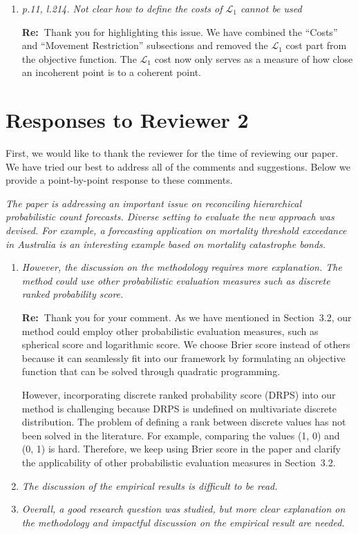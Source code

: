 \documentclass[11pt,a4paper]{article}
\newcommand{\RE}[2][Re:~]{{\color{blue}\textbf{#1}#2}}
\begin{document}
\begin{enumerate}
\begin{enumerate}
    \RE{Done. Thank you.}
    \item \textit{p.11, l.214. Not clear how to define the costs of $\mathcal{L}_1$ cannot be used}
    
    \RE{Thank you for highlighting this issue. We have combined the ``Costs'' and ``Movement Restriction'' subsections and removed the $\mathcal{L}_1$ cost part from the objective function. The $\mathcal{L}_1$ cost now only serves as a measure of how close an incoherent point is to a coherent point.}

  \end{enumerate}

\end{enumerate}
\newpage
\section*{Responses to Reviewer 2}\label{reviewer-2-comments}

\RE[]{First, we would like to thank the reviewer for the time of reviewing our paper. We have tried our best to address all of the comments and suggestions. Below we provide a point-by-point response to these comments.}

\textit{The paper is addressing an important issue on reconciling hierarchical probabilistic count forecasts. Diverse setting to evaluate the new approach was devised. For example, a forecasting application on mortality threshold exceedance in Australia is an interesting example based on mortality catastrophe bonds.}

\begin{enumerate}
    \item \textit{However, the discussion on the methodology requires more explanation. The method could use other probabilistic evaluation measures such as discrete ranked probability score.}
   
    \RE{Thank you for your comment. As we have mentioned in Section~3.2, our method could employ other probabilistic evaluation measures, such as spherical score and logarithmic score. We choose Brier score instead of others because it can seamlessly fit into our framework by formulating an objective function that can be solved through quadratic programming.
    
    However, incorporating discrete ranked probability score (DRPS) into our method is challenging because DRPS is undefined on multivariate discrete distribution. The problem of defining a rank between discrete values has not been solved in the literature. For example, comparing the values (1, 0) and (0, 1) is hard. Therefore, we keep using Brier score in the paper and clarify the applicability of other probabilistic evaluation measures in Section~3.2.
    }

    \item \textit{The discussion of the empirical results is difficult to be read.}
    \item \textit{Overall, a good research question was studied, but more clear explanation on the methodology and impactful discussion on the empirical result are needed.}
\end{enumerate}
\end{document}
